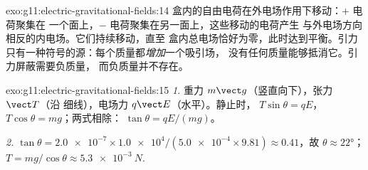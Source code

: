 \begin{solution}{exo:g11:electric-gravitational-fields:14}
盒内的自由电荷在外电场作用下移动：$+$ 电荷聚集在
一个面上，$-$ 电荷聚集在另一面上，这些移动的电荷产生
与外电场方向相反的内电场。它们持续移动，直至
盒内总电场恰好为零，此时达到平衡。引力
只有一种符号的源：每个质量都\emph{增加}一个吸引场，
没有任何质量能够抵消它。引力屏蔽需要负质量，
而负质量并不存在。
\end{solution}

\begin{solution}{exo:g11:electric-gravitational-fields:15}
\emph{1.} 重力 $m\vect g$（竖直向下），张力 $\vect T$（沿
细线），电场力 $q\vect E$（水平）。静止时，
$T\sin\theta = qE$，$T\cos\theta = mg$；两式相除：
$\tan\theta = qE/(mg)$。

\emph{2.} $\tan\theta = \num{2.0e-7} \times \num{1.0e4} /
(\num{5.0e-4} \times 9.81) \approx 0.41$，故 $\theta \approx \ang{22}$；
$T = mg/\cos\theta \approx \qty{5.3e-3}{N}$.
\end{solution}

